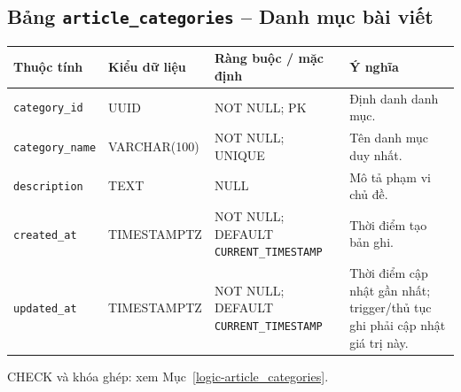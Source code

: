 \subsection{Bảng \texttt{article\_\allowbreak{}categories} -- Danh mục bài viết}
\label{dictionary-article_categories}
\begingroup
\footnotesize
\setlength{\tabcolsep}{3pt}
\begin{longtable}{>{\raggedright\arraybackslash}p{3.1cm}>{\raggedright\arraybackslash}p{2.5cm}>{\raggedright\arraybackslash}p{3.7cm}>{\raggedright\arraybackslash}p{4.3cm}}
\toprule
Thuộc tính & Kiểu dữ liệu & Ràng buộc / mặc định & Ý nghĩa \\
\midrule
\endhead
\texttt{category\_\allowbreak{}id} & UUID & NOT NULL; PK & Định danh danh mục. \\
\texttt{category\_\allowbreak{}name} & VARCHAR(100) & NOT NULL; UNIQUE & Tên danh mục duy nhất. \\
\texttt{description} & TEXT & NULL & Mô tả phạm vi chủ đề. \\
\texttt{created\_\allowbreak{}at} & TIMESTAMPTZ & NOT NULL; DEFAULT \texttt{CURRENT\_\allowbreak{}TIMESTAMP} & Thời điểm tạo bản ghi. \\
\texttt{updated\_\allowbreak{}at} & TIMESTAMPTZ & NOT NULL; DEFAULT \texttt{CURRENT\_\allowbreak{}TIMESTAMP} & Thời điểm cập nhật gần nhất; trigger/thủ tục ghi phải cập nhật giá trị này. \\
\bottomrule
\end{longtable}
\endgroup
CHECK và khóa ghép: xem Mục~\ref{logic-article_categories}.
